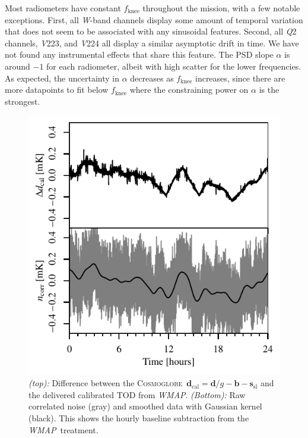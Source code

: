 \documentclass[twocolumn]{../../common/aa}
\def\WMAP{\emph{WMAP}}
\newcommand{\cosmoglobe}{\textsc{Cosmoglobe}}
\newcommand{\Q}[0]{\textit Q}
\newcommand{\V}[0]{\textit V}
\newcommand{\W}[0]{\textit W}
\begin{document}
Most radiometers have constant $f_\mathrm{knee}$ throughout the mission, with a few notable exceptions. First, all \W-band channels display some amount of temporal variation that does not seem to be associated with any sinusoidal features. Second, all \Q2 channels, \V223, and \V224 all display a similar asymptotic drift in time. We have not found any instrumental effects that share this feature.
The PSD slope $\alpha$ is around $-1$ for each radiometer, albeit with high scatter for the lower frequencies. As expected, the uncertainty in $\alpha$ decreases as $f_\mathrm{knee}$ increases, since there are more datapoints to fit below $f_\mathrm{knee}$ where the constraining power on $\alpha$ is the strongest.

\begin{figure}
	\includegraphics[width=\columnwidth]{figures/K113_TOD_diff_10hr.pdf}
	\caption{\textit{(top):} Difference between the \cosmoglobe\ $\boldsymbol d_\mathrm{cal}=\boldsymbol d/g-\boldsymbol b - \boldsymbol s_\mathrm{sl}$ and the delivered calibrated TOD from \WMAP. \textit{(Bottom):} Raw correlated noise (gray) and smoothed data with Gaussian kernel (black). This shows the hourly baseline subtraction from the \WMAP\ treatment.}
	\label{fig:cal_comp}
\end{figure}
\end{document}
